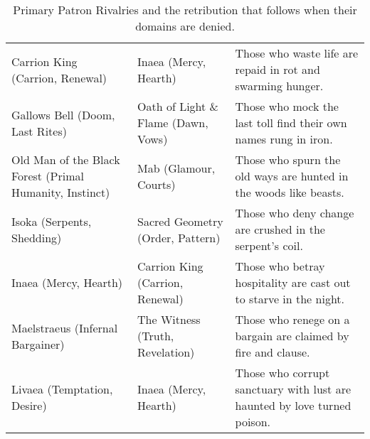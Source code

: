 \begin{table}[h!]
\begin{tabular}{@{}p{3.4cm}p{3.4cm}p{8.2cm}@{}}
    Carrion King (Carrion, Renewal) & Inaea (Mercy, Hearth) & Those who waste life are repaid in rot and swarming hunger. \\
    Gallows Bell (Doom, Last Rites) & Oath of Light \& Flame (Dawn, Vows) & Those who mock the last toll find their own names rung in iron. \\
    Old Man of the Black Forest (Primal Humanity, Instinct) & Mab (Glamour, Courts) & Those who spurn the old ways are hunted in the woods like beasts. \\
    Isoka (Serpents, Shedding) & Sacred Geometry (Order, Pattern) & Those who deny change are crushed in the serpent’s coil. \\
    Inaea (Mercy, Hearth) & Carrion King (Carrion, Renewal) & Those who betray hospitality are cast out to starve in the night. \\
    Maelstraeus (Infernal Bargainer) & The Witness (Truth, Revelation) & Those who renege on a bargain are claimed by fire and clause. \\
    Livaea (Temptation, Desire) & Inaea (Mercy, Hearth) & Those who corrupt sanctuary with lust are haunted by love turned poison. \\
    \bottomrule
  \end{tabular}
  \caption{Primary Patron Rivalries and the retribution that follows when their domains are denied.}
\end{table}
